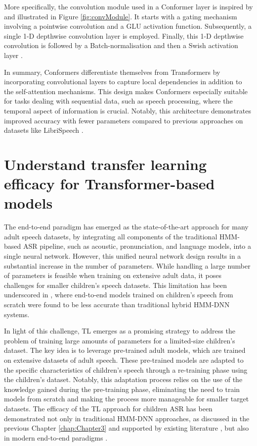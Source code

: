 More specifically, the convolution module used in a Conformer layer is inspired by \cite{wu2020lite} and illustrated in Figure \ref{fig:convModule}. It starts with a gating mechanism \cite{dauphin2017language} involving a pointwise convolution and a \ac{GLU} activation function. Subsequently, a single 1-D depthwise convolution layer is employed. Finally, this 1-D depthwise convolution is followed by a Batch-normalisation and then a Swish activation layer \cite{Prajit2017Searching}.

In summary, Conformers differentiate themselves from Transformers by incorporating convolutional layers to capture local dependencies in addition to the self-attention mechanisms. This design makes Conformers especially suitable for tasks dealing with sequential data, such as speech processing, where the temporal aspect of information is crucial. Notably, this architecture demonstrates improved accuracy with fewer parameters compared to previous approaches on datasets like LibriSpeech \cite{gulati2020conformer}.


\section{Understand transfer learning efficacy for Transformer-based models}
The end-to-end paradigm has emerged as the state-of-the-art approach for many adult speech datasets, by integrating all components of the traditional \ac{HMM}-based \ac{ASR} pipeline, such as acoustic, pronunciation, and language models, into a single neural network. However, this unified neural network design results in a substantial increase in the number of parameters. While handling a large number of parameters is feasible when training on extensive adult data, it poses challenges for smaller children's speech datasets. This limitation has been underscored in \cite{sri_end2end,gelin2021endtoend}, where end-to-end models trained on children's speech from scratch were found to be less accurate than traditional hybrid \ac{HMM-DNN} systems.

In light of this challenge, \ac{TL} emerges as a promising strategy to address the problem of training large amounts of parameters for a limited-size children's dataset. The key idea is to leverage pre-trained adult models, which are trained on extensive datasets of adult speech. These pre-trained models are adapted to the specific characteristics of children's speech through a re-training phase using the children's dataset. Notably, this adaptation process relies on the use of the knowledge gained during the pre-training phase, eliminating the need to train models from scratch and making the process more manageable for smaller target datasets. The efficacy of the \ac{TL} approach for children \ac{ASR} has been demonstrated not only in traditional \ac{HMM-DNN} approaches, as discussed in the previous Chapter \ref{chap:Chapter3} and supported by existing literature \cite{shivakumar2020transfer}, but also in modern end-to-end paradigms \cite{sri_end2end,gelin2021endtoend}.

